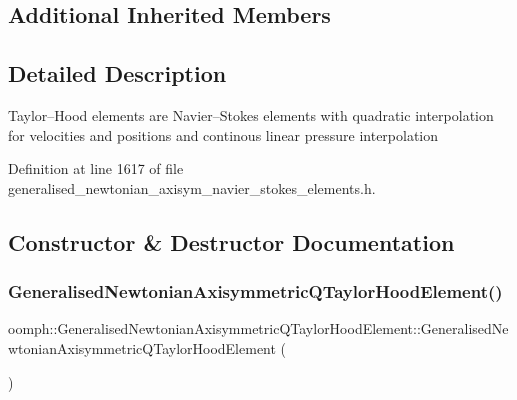 \subsection*{Additional Inherited Members}


\subsection{Detailed Description}
Taylor--Hood elements are Navier--Stokes elements with quadratic interpolation for velocities and positions and continous linear pressure interpolation 

Definition at line 1617 of file generalised\+\_\+newtonian\+\_\+axisym\+\_\+navier\+\_\+stokes\+\_\+elements.\+h.



\subsection{Constructor \& Destructor Documentation}
\mbox{\label{classoomph_1_1GeneralisedNewtonianAxisymmetricQTaylorHoodElement_a29b42f6405e73cdaebd2f78267bf3435}} 
\subsubsection{\texorpdfstring{Generalised\+Newtonian\+Axisymmetric\+Q\+Taylor\+Hood\+Element()}{GeneralisedNewtonianAxisymmetricQTaylorHoodElement()}}
{\footnotesize\ttfamily oomph\+::\+Generalised\+Newtonian\+Axisymmetric\+Q\+Taylor\+Hood\+Element\+::\+Generalised\+Newtonian\+Axisymmetric\+Q\+Taylor\+Hood\+Element (\begin{DoxyParamCaption}{ }\end{DoxyParamCaption})\hspace{0.3cm}{\ttfamily [inline]}}



